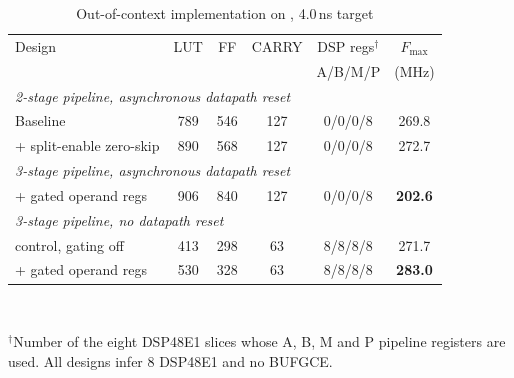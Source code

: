 \begin{table}[t]
\caption{Out-of-context implementation on \PART, 4.0\,ns target}
\label{tab:area}
\centering\footnotesize
\setlength{\tabcolsep}{4pt}
\begin{tabular}{lccccc}
\toprule
Design & LUT & FF & CARRY & DSP regs$^{\dagger}$ & $F_{\max}$\\
       &     &    &       & A/B/M/P              & (MHz)\\
\midrule
\multicolumn{6}{l}{\emph{2-stage pipeline, asynchronous datapath reset}}\\
\quad Baseline               & 789 & 546 & 127 & 0/0/0/8 & 269.8\\
\quad + split-enable zero-skip & 890 & 568 & 127 & 0/0/0/8 & 272.7\\[2pt]
\multicolumn{6}{l}{\emph{3-stage pipeline, asynchronous datapath reset}}\\
\quad + gated operand regs   & 906 & 840 & 127 & 0/0/0/8 & \textbf{202.6}\\[2pt]
\multicolumn{6}{l}{\emph{3-stage pipeline, no datapath reset}}\\
\quad control, gating off    & 413 & 298 &  63 & 8/8/8/8 & 271.7\\
\quad + gated operand regs   & 530 & 328 &  63 & 8/8/8/8 & \textbf{283.0}\\
\bottomrule
\end{tabular}
\\[2pt]
\raggedright\scriptsize $^{\dagger}$Number of the eight DSP48E1 slices whose
A, B, M and P pipeline registers are used. All designs infer 8 DSP48E1 and
no BUFGCE.
\end{table}
